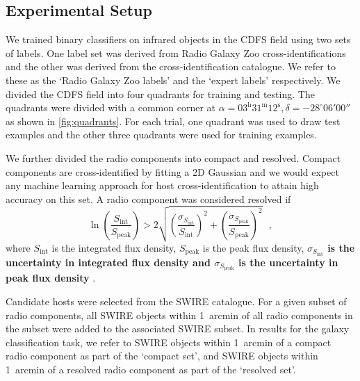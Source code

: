 \documentclass[fleqn,usenatbib,usedcolumn]{mnras}
\newcommand{\edited}[1]{{\bf {#1}}}
\begin{document}
  \subsection{Experimental Setup}
  \label{sec:experimental-setup}

    We trained binary classifiers on infrared objects in the CDFS field using
    two sets of labels. One label set was derived from Radio Galaxy Zoo
    cross-identifications and the other was derived from the \citet{norris06}
    cross-identification catalogue. We refer to these as the `Radio Galaxy Zoo
    labels' and the `expert labels' respectively. We divided the CDFS field
    into four quadrants for training and testing. The quadrants were divided
    with a common corner at $\alpha = 03^\text{h}31^\text{m}12^\text{s},
    \delta = -28^\circ{}06'00''$ as shown in \autoref{fig:quadrants}. For
    each trial, one quadrant was used to draw test examples and the other
    three quadrants were used for training examples.

    We further divided the radio components into compact and resolved. Compact
    components are cross-identified by fitting a 2D Gaussian \citep[as
    in][]{norris06} and we would expect any machine learning approach for host
    cross-identification to attain high accuracy on this set. A radio component was
    considered resolved if
    \begin{equation}
        \ln \left(
          \frac{S_{\text{int}}}
               {S_{\text{peak}}}
        \right) > 2\sqrt{\left(
          \frac{\sigma_{S_{\text{int}}}}
               {S_{\text{int}}}
        \right)^2 + \left(
          \frac{\sigma_{S_{\text{peak}}}}
               {S_{\text{peak}}}
        \right)^2}\,\,\,\,,
    \end{equation}%
    where \(S_{\text{int}}\) is the integrated flux density,
    \(S_{\text{peak}}\) is the peak flux density, \edited{$\sigma_{S_{\text{int}}}$ is
    the uncertainty in integrated flux density and $\sigma_{S_{\text{peak}}}$
    is the uncertainty in peak flux density} \citep[following][]{franzen15}.

    Candidate hosts were selected from the SWIRE catalogue. For a given subset
    of radio components, all SWIRE objects within 1~arcmin of all radio
    components in the subset were added to the associated SWIRE subset. In results
    for the galaxy classification task, we refer to SWIRE objects
    within 1~arcmin of a compact radio component as part of the `compact set',
    and SWIRE objects within 1~arcmin of a resolved radio component as part of
    the `resolved set'.
\end{document}
